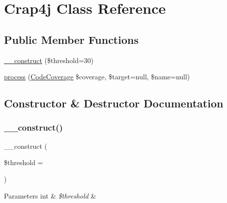 \hypertarget{class_sebastian_bergmann_1_1_code_coverage_1_1_report_1_1_crap4j}{}\section{Crap4j Class Reference}
\label{class_sebastian_bergmann_1_1_code_coverage_1_1_report_1_1_crap4j}
\subsection*{Public Member Functions}
\begin{DoxyCompactItemize}
\item 
\mbox{\hyperlink{class_sebastian_bergmann_1_1_code_coverage_1_1_report_1_1_crap4j_a8d4c74e8ff1278f7bf19d6f11f25e4a2}{\+\_\+\+\_\+construct}} (\$threshold=30)
\item 
\mbox{\hyperlink{class_sebastian_bergmann_1_1_code_coverage_1_1_report_1_1_crap4j_af2f58c151701fd52866cfa6150b3fb90}{process}} (\mbox{\hyperlink{class_sebastian_bergmann_1_1_code_coverage_1_1_code_coverage}{Code\+Coverage}} \$coverage, \$target=null, \$name=null)
\end{DoxyCompactItemize}


\subsection{Constructor \& Destructor Documentation}
\mbox{\label{class_sebastian_bergmann_1_1_code_coverage_1_1_report_1_1_crap4j_a8d4c74e8ff1278f7bf19d6f11f25e4a2}} 
\subsubsection{\texorpdfstring{\+\_\+\+\_\+construct()}{\_\_construct()}}
{\footnotesize\ttfamily \+\_\+\+\_\+construct (\begin{DoxyParamCaption}\item[{}]{\$threshold = {} }\end{DoxyParamCaption})}


\begin{DoxyParams}[1]{Parameters}
int & {\em \$threshold} & \\
\hline
\end{DoxyParams}


